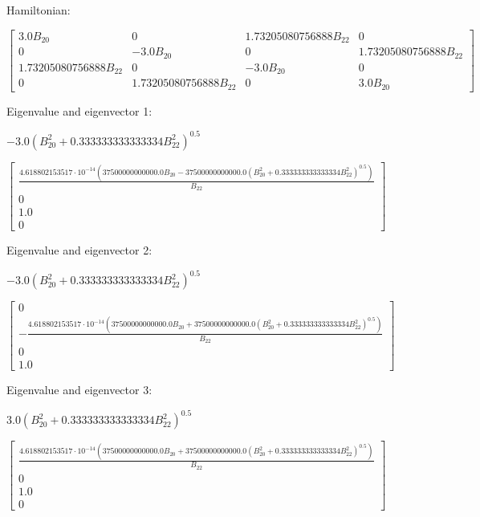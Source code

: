 \documentclass[8pt]{report}
\begin{document}
Hamiltonian:

\begin{math}
\left[\begin{matrix}3.0 B_{20} & 0 & 1.73205080756888 B_{22} & 0\\0 & - 3.0 B_{20} & 0 & 1.73205080756888 B_{22}\\1.73205080756888 B_{22} & 0 & - 3.0 B_{20} & 0\\0 & 1.73205080756888 B_{22} & 0 & 3.0 B_{20}\end{matrix}\right]
\end{math}

Eigenvalue and eigenvector 1:

\begin{math}
- 3.0 \left(B_{20}^{2} + 0.333333333333334 B_{22}^{2}\right)^{0.5}
\end{math}

\begin{math}
\left[\begin{matrix}\frac{4.618802153517 \cdot 10^{-14} \left(37500000000000.0 B_{20} - 37500000000000.0 \left(B_{20}^{2} + 0.333333333333334 B_{22}^{2}\right)^{0.5}\right)}{B_{22}}\\0\\1.0\\0\end{matrix}\right]
\end{math}

Eigenvalue and eigenvector 2:

\begin{math}
- 3.0 \left(B_{20}^{2} + 0.333333333333334 B_{22}^{2}\right)^{0.5}
\end{math}

\begin{math}
\left[\begin{matrix}0\\- \frac{4.618802153517 \cdot 10^{-14} \left(37500000000000.0 B_{20} + 37500000000000.0 \left(B_{20}^{2} + 0.333333333333334 B_{22}^{2}\right)^{0.5}\right)}{B_{22}}\\0\\1.0\end{matrix}\right]
\end{math}

Eigenvalue and eigenvector 3:

\begin{math}
3.0 \left(B_{20}^{2} + 0.333333333333334 B_{22}^{2}\right)^{0.5}
\end{math}

\begin{math}
\left[\begin{matrix}\frac{4.618802153517 \cdot 10^{-14} \left(37500000000000.0 B_{20} + 37500000000000.0 \left(B_{20}^{2} + 0.333333333333334 B_{22}^{2}\right)^{0.5}\right)}{B_{22}}\\0\\1.0\\0\end{matrix}\right]
\end{math}
\end{document}
